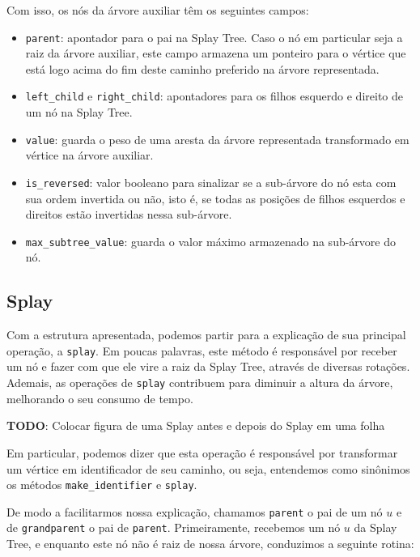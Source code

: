 Com isso, os nós da árvore auxiliar têm os seguintes campos:

\begin{itemize}
    \item \texttt{parent}: apontador para o pai na Splay Tree. Caso o nó em particular seja a raiz da árvore auxiliar, este campo armazena um ponteiro para o vértice que está logo acima do fim deste caminho preferido na árvore representada.
    \item \texttt{left\_child} e \texttt{right\_child}: apontadores para os filhos esquerdo e direito de um nó na Splay Tree.
    \item \texttt{value}: guarda o peso de uma aresta da árvore representada transformado em vértice na árvore auxiliar.
    \item \texttt{is\_reversed}: valor booleano para sinalizar se a sub-árvore do nó esta com sua ordem invertida ou não, isto é, se todas as posições de filhos esquerdos e direitos estão  invertidas nessa  sub-árvore.
    \item \texttt{max\_subtree\_value}: guarda o valor máximo armazenado na sub-árvore do nó.
\end{itemize}

\subsection{Splay}
\label{subsection:lct-splay-splay}

Com a estrutura apresentada, podemos partir para a explicação de sua principal operação, a \texttt{splay}. Em poucas palavras, este método é responsável por receber um nó e fazer com que ele vire a raiz da Splay Tree, através de diversas rotações.  Ademais, as operações de \texttt{splay} contribuem para diminuir a altura da árvore, melhorando o seu consumo de tempo.

\begin{center}
    \textbf{TODO}: Colocar figura de uma Splay antes e depois do Splay em uma folha
\end{center}

Em particular, podemos dizer que esta operação é responsável por transformar um vértice em identificador de seu caminho, ou seja, entendemos como sinônimos os métodos \texttt{make\_identifier} e \texttt{splay}.

De modo a facilitarmos nossa explicação, chamamos \texttt{parent} o pai de um nó $u$ e de \texttt{grandparent} o pai de \texttt{parent}. Primeiramente, recebemos um nó $u$ da Splay Tree, e enquanto este nó não é raiz de nossa árvore, conduzimos a seguinte rotina:

